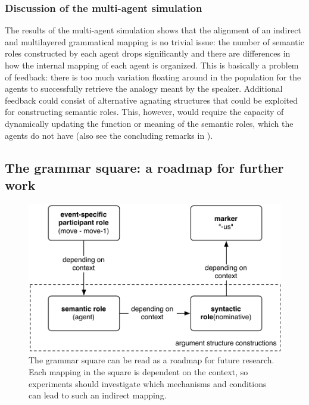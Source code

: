 \subsubsection{Discussion of the multi-agent simulation}
 The results of the multi-agent simulation shows that the alignment of an indirect and multilayered grammatical mapping is no trivial issue: the number of semantic roles constructed by each agent drops significantly and there are differences in how the internal mapping of each agent is organized. This is basically a problem of feedback: there is too much variation floating around in the population for the agents to successfully retrieve the analogy meant by the speaker. Additional feedback could consist of alternative agnating structures that could be exploited for constructing semantic roles. This, however, would require the capacity of dynamically updating the function or meaning of the semantic roles, which the agents do not have (also see the concluding remarks in ).

\subsection{The grammar square: a roadmap for further work}
\label{s:future}

\begin{figure}[t]
\centerline{\includegraphics[scale=0.7]{Chapter4/figs/case}}
  \caption[The grammatical square]{The grammar square can be read as a roadmap for future research. Each mapping in the square is dependent on the context, so experiments should investigate which mechanisms and conditions can lead to such an indirect mapping.}
   \label{f:square-bis}
\end{figure}

